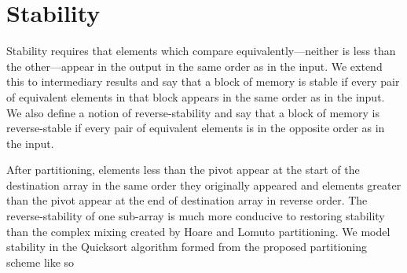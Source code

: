 \documentclass{juliacon}
\begin{document}

\vspace{-10pt}

\section{Stability}

Stability requires that elements which compare equivalently---neither is less than the other---appear in the output in the same order as in the input. We extend this to intermediary results and say that a block of memory is stable if every pair of equivalent elements in that block appears in the same order as in the input. We also define a notion of reverse-stability and say that a block of memory is reverse-stable if every pair of equivalent elements is in the opposite order as in the input.

After partitioning, elements less than the pivot appear at the start of the destination array in the same order they originally appeared and elements greater than the pivot appear at the end of destination array in reverse order. The reverse-stability of one sub-array is much more conducive to restoring stability than the complex mixing created by Hoare \cite{quicksort} and Lomuto \cite{lomuto} partitioning. We model stability in the Quicksort algorithm formed from the proposed partitioning scheme like so

\vspace{8pt}
\end{document}
